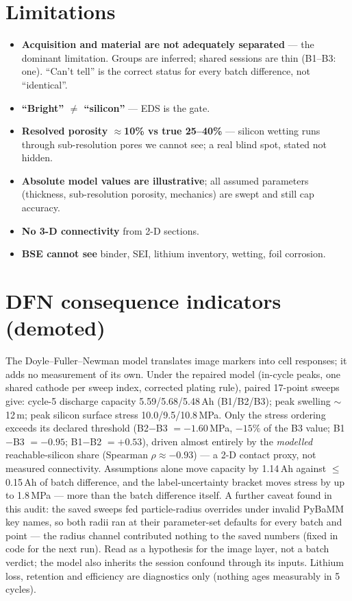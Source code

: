 \documentclass[10pt,a4paper]{article}
\begin{document}
\section{Limitations}
\label{sec:limits}

\begin{itemize}
\item \textbf{Acquisition and material are not adequately separated} ---
the dominant limitation. Groups are inferred; shared sessions are thin
(B1--B3: one). ``Can't tell'' is the correct status for every batch
difference, not ``identical''.
\item \textbf{``Bright'' $\neq$ ``silicon''} --- EDS is the gate.
\item \textbf{Resolved porosity $\approx$10\% vs true 25--40\%} ---
silicon wetting runs through sub-resolution pores we cannot see; a real
blind spot, stated not hidden.
\item \textbf{Absolute model values are illustrative}; all assumed
parameters (thickness, sub-resolution porosity, mechanics) are swept and
still cap accuracy.
\item \textbf{No 3-D connectivity} from 2-D sections.
\item \textbf{BSE cannot see} binder, SEI, lithium inventory, wetting,
foil corrosion.
\end{itemize}

\appendix
\section{DFN consequence indicators (demoted)}
\label{app:dfn}

The Doyle--Fuller--Newman model translates image markers into cell
responses; it adds no measurement of its own. Under the repaired model
(in-cycle peaks, one shared cathode per sweep index, corrected plating
rule), paired 17-point sweeps give: cycle-5 discharge capacity
5.59/5.68/5.48\,Ah (B1/B2/B3); peak swelling $\sim$12\,\textmu m;
peak silicon surface stress 10.0/9.5/10.8\,MPa. Only the stress ordering
exceeds its declared threshold (B2$-$B3 $=-1.60$\,MPa, $-15\%$ of the B3
value; B1$-$B3 $=-0.95$; B1$-$B2 $=+0.53$), driven almost entirely by the
\emph{modelled} reachable-silicon share (Spearman $\rho\approx-0.93$) ---
a 2-D contact proxy, not measured connectivity. Assumptions alone move
capacity by 1.14\,Ah against $\le$0.15\,Ah of batch difference, and the
label-uncertainty bracket moves stress by up to 1.8\,MPa --- more than
the batch difference itself. A further caveat found in this audit: the
saved sweeps fed particle-radius overrides under invalid PyBaMM key
names, so both radii ran at their parameter-set defaults for every
batch and point --- the radius channel contributed nothing to the saved
numbers (fixed in code for the next run). Read as a hypothesis for the
image layer,
not a batch verdict; the model also inherits the session confound through
its inputs. Lithium loss, retention and efficiency are diagnostics only
(nothing ages measurably in 5 cycles).
\end{document}

